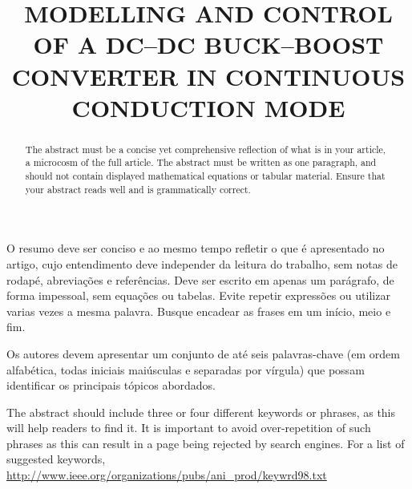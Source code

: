 \title{MODELLING AND CONTROL OF A DC--DC BUCK--BOOST CONVERTER IN CONTINUOUS CONDUCTION MODE} %

\maketitle




\begin{resumo}  O resumo deve ser conciso e ao mesmo tempo refletir o que é apresentado no artigo, cujo entendimento deve independer da leitura do trabalho, sem notas de rodapé, abreviações e referências. Deve ser escrito em apenas um parágrafo, de forma impessoal, sem equações ou tabelas. Evite repetir expressões ou utilizar varias vezes a mesma palavra. Busque encadear as frases em um início, meio e fim.
\end{resumo}

\begin{palavraschave }
		Os autores devem apresentar um conjunto de até seis palavras-chave (em ordem alfabética, todas iniciais maiúsculas e separadas por vírgula) que possam identificar os principais tópicos abordados.	
\end{palavraschave }

\englishtitle

\begin{abstract}
	The abstract must be a concise yet comprehensive reflection of what is in your article, a microcosm of the full article. The abstract must be written as one paragraph, and should not contain displayed mathematical equations or tabular material.  Ensure that your abstract reads well and is grammatically correct.
\end{abstract}

\begin{keywords}
	The abstract should include three or four different keywords or phrases, as this will help readers to find it. It is important to avoid over-repetition of such phrases as this can result in a page being rejected by search engines. For a list of suggested keywords, \url{http://www.ieee.org/organizations/pubs/ani_prod/keywrd98.txt}
\end{keywords}

